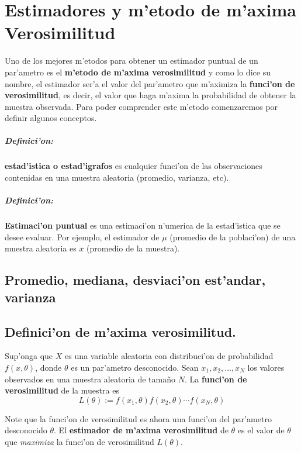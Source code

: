 \documentclass[a4paper]{report}
\begin{document}
\chapter{Estimadores y m'etodo de m'axima Verosimilitud}


Uno de los mejores m'etodos para obtener un estimador puntual de un par'ametro es el \textbf{m'etodo de m'axima verosimilitud} y como lo dice su nombre, el estimador ser'a el valor del par'ametro que m'aximiza la \textbf{funci'on de verosimilitud}, es decir, el valor que haga m'axima la probabilidad de obtener la muestra observada.
Para poder comprender este m'etodo comenzaremos por definir algunos conceptos.

\paragraph{Definici'on:} \textbf{estad'istica o estad'igrafos} es cualquier funci'on de las observaciones contenidas en una muestra aleatoria (promedio, varianza, etc).

\paragraph{Definici'on:} \textbf{Estimaci'on puntual} es una estimaci'on n'umerica de la estad'istica que se desee evaluar. Por ejemplo, el estimador de $\mu$ (promedio de la poblaci'on) de una muestra aleatoria es $\overline{x}$ (promedio de la muestra).

\section{Promedio, mediana, desviaci'on est'andar, varianza}


\section{Definici'on de m'axima verosimilitud.}
Sup'onga que $X$ es una variable aleatoria con distribuci'on de probabilidad $f(x,\theta)$, donde $\theta$ es un par'ametro desconocido. Sean $x_1,x_2,\dots, x_N$ los valores observados en una muestra aleatoria de tama\~no $N$. La \textbf{funci'on de verosimilitud} de la muestra es
\begin{equation}
L(\theta):=f(x_1 ,\theta)f(x_2,\theta)\cdots f(x_N ,\theta)
\end{equation} 

Note que la funci'on de verosimilitud es ahora una funci'on del par'ametro desconocido $\theta$. El \textbf{estimador de m'axima verosimilitud} de $\theta$ es el valor de $\theta$ que \textit{maximiza} la funci'on de verosimilitud $L(\theta)$.
\end{document}
